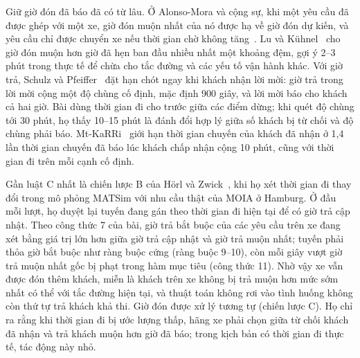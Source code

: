 Giữ giờ đón đã báo đã có từ lâu. Ở Alonso-Mora và cộng sự, khi một yêu cầu đã được ghép với một xe, giờ đón muộn nhất
của nó được hạ về giờ đón dự kiến, và yêu cầu chỉ được chuyển xe nếu thời gian chờ không tăng~\cite{alonsomora2017}.
Lu và Kühnel~\cite{lu2024} cho giờ đón muộn hơn giờ đã hẹn ban đầu nhiều nhất một khoảng đệm, gợi ý 2--3 phút trong
thực tế để chừa cho tắc đường và các yếu tố vận hành khác. Với giờ trả, Schulz và Pfeiffer~\cite{schulz2026} đặt hạn
chót ngay khi khách nhận lời mời: giờ trả trong lời mời cộng một độ chùng cố định, mặc định 900 giây, và lời mời báo
cho khách cả hai giờ. Bài dùng thời gian đi cho trước giữa các điểm dừng; khi quét độ chùng tới 30 phút, họ thấy 10--15
phút là đánh đổi hợp lý giữa số khách bị từ chối và độ chùng phải báo. Mt-KaRRi~\cite{laupichler2026} giới hạn thời
gian chuyến của khách đã nhận ở 1,4 lần thời gian chuyến đã báo lúc khách chấp nhận cộng 10 phút, cũng với thời gian
đi trên mỗi cạnh cố định.

Gần luật C nhất là chiến lược B của Hörl và Zwick~\cite{horl2022}, khi họ xét thời gian đi thay đổi trong mô phỏng
MATSim với nhu cầu thật của MOIA ở Hamburg. Ở đầu mỗi lượt, họ duyệt lại tuyến đang gán theo thời gian đi hiện tại để
có giờ trả cập nhật. Theo công thức 7 của bài, giờ trả bắt buộc của các yêu cầu trên xe đang xét bằng giá trị lớn hơn
giữa giờ trả cập nhật và giờ trả muộn nhất; tuyến phải thỏa giờ bắt buộc như ràng buộc cứng (ràng buộc 9--10), còn
mỗi giây vượt giờ trả muộn nhất gốc bị phạt trong hàm mục tiêu (công thức 11). Nhờ vậy xe vẫn được đón thêm khách, miễn
là khách trên xe không bị trả muộn hơn mức sớm nhất có thể với tắc đường hiện tại, và thuật toán không rơi vào tình
huống không còn thứ tự trả khách khả thi. Giờ đón được xử lý tương tự (chiến lược C). Họ chỉ ra rằng khi thời gian đi
bị ước lượng thấp, hãng xe phải chọn giữa từ chối khách đã nhận và trả khách muộn hơn giờ đã báo; trong kịch bản có
thời gian đi thực tế, tác động này nhỏ.

